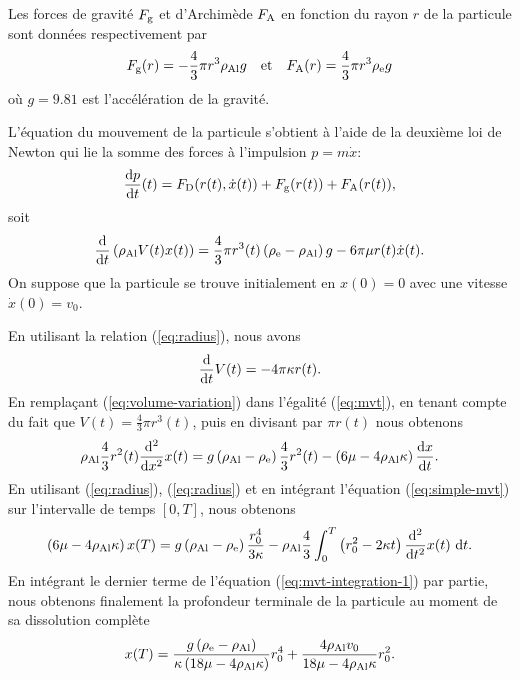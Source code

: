 Les forces de gravité $F_{\mathrm g}$ et d'Archimède $F_{\mathrm A}$
en fonction du rayon $r$ de la particule sont données respectivement
par
\begin{equation*}
F_{\mathrm g}(r) = -\frac{4}{3}\pi r^3 \rho_\mathrm{Al} g
\quad\text{et}\quad
F_{\mathrm A}(r) = \frac{4}{3}\pi r^3 \rho_\mathrm{e} g
\end{equation*}
où $g = 9.81$ est l'accélération de la gravité.

L'équation du mouvement de la particule s'obtient à l'aide de la
deuxième loi de Newton qui lie la somme des forces à l'impulsion $p =
m\dot x$:
\begin{equation*}
\frac{\mathrm dp}{\mathrm dt}(t) = F_{\mathrm D}(r(t), \dot x(t)) + F_{\mathrm g}(r(t)) + F_{\mathrm A}(r(t)),
\end{equation*}
soit
\begin{equation}\label{eq:mvt}
  \frac{\mathrm d}{\mathrm dt}\left( \rho_\mathrm{Al} V(t)x(t) \right) =
  \frac{4}{3}\pi r^3(t)\left( \rho_\mathrm{e} - \rho_\mathrm{Al} \right)g -
  6\pi\mu r(t)\dot x(t).
\end{equation}
On suppose que la particule se trouve initialement en $x(0) = 0$ avec
une vitesse $\dot x(0) = v_0$.

En utilisant la relation (\ref{eq:radius}), nous avons
\begin{equation}\label{eq:volume-variation}
  \frac{\mathrm d}{\mathrm dt}V(t) = -4\pi \kappa r(t).
\end{equation}
En remplaçant (\ref{eq:volume-variation}) dans l'égalité
(\ref{eq:mvt}), en tenant compte du fait que $V(t) = \frac{4}{3}\pi
r^3(t)$, puis en divisant par $\pi r(t)$ nous obtenons
\begin{equation}\label{eq:simple-mvt}
\rho_\mathrm{Al} \frac{4}{3}r^2(t)\frac{\mathrm d^2}{\mathrm dx^2}x(t)
= g\left( \rho_\mathrm{Al} - \rho_\mathrm{e} \right)\frac{4}{3}r^2(t) -
\left( 6\mu - 4\rho_\mathrm{Al}
  \kappa \right)\frac{\mathrm dx}{\mathrm dt}.
\end{equation}
En utilisant (\ref{eq:radius}), (\ref{eq:radius}) et en
intégrant l'équation (\ref{eq:simple-mvt}) sur l'intervalle de temps $[0, T]$, nous
obtenons
\begin{equation}\label{eq:mvt-integration-1}
\left( 6\mu - 4\rho_\mathrm{Al}\kappa \right)x(T)
= g\left( \rho_\mathrm{Al} -
  \rho_\mathrm{e} \right)\frac{r_0^4}{3\kappa}-\rho_\mathrm{Al}\frac{4}{3}\int_0^T\left( r_0^2
- 2\kappa t \right)\frac{\mathrm d^2}{\mathrm dt^2}x(t)\,\,\mathrm dt.
\end{equation}
En intégrant le dernier terme de l'équation
(\ref{eq:mvt-integration-1}) par partie, nous obtenons finalement la
profondeur terminale de la particule au moment de sa dissolution complète
\begin{equation}\label{eq:particle-terminal-position}
x(T) = \frac{g\left( \rho_\mathrm{e} -
    \rho_\mathrm{Al} \right)}{\kappa
  \left( 18\mu - 4\rho_\mathrm{Al}
    \kappa \right)}r_0^4 + \frac{4 \rho_\mathrm{Al}
  v_0}{18\mu - 4\rho_\mathrm{Al} \kappa} r_0^2.
\end{equation}


